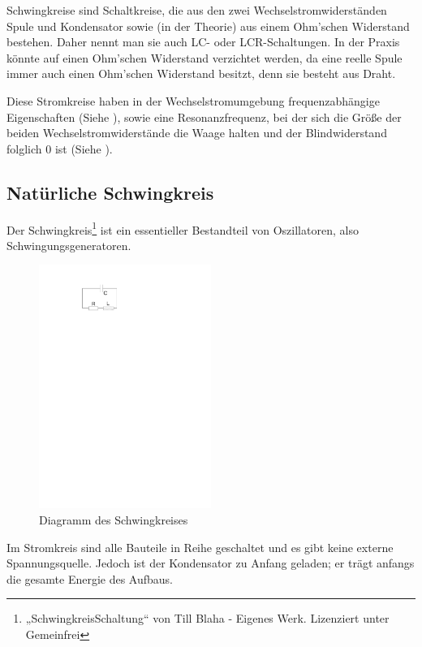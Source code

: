 
Schwingkreise sind Schaltkreise, die aus den zwei Wechselstromwiderständen Spule und Kondensator sowie (in der Theorie) aus einem Ohm'schen Widerstand bestehen. Daher nennt man sie auch LC- oder LCR-Schaltungen. In der Praxis könnte auf einen Ohm'schen Widerstand verzichtet werden, da eine reelle Spule immer auch einen Ohm'schen Widerstand besitzt, denn sie besteht aus Draht. 

Diese Stromkreise haben in der Wechselstromumgebung frequenzabhängige Eigenschaften (Siehe ), sowie eine Resonanzfrequenz, bei der sich die Größe der beiden Wechselstromwiderstände die Waage halten und der Blindwiderstand folglich $0$ ist (Siehe ).

\subsection{Natürliche Schwingkreis}

Der Schwingkreis\footnote{„SchwingkreisSchaltung“ von Till Blaha - Eigenes Werk. Lizenziert unter Gemeinfrei} ist ein essentieller Bestandteil von Oszillatoren, also Schwingungsgeneratoren. 

\begin{figure}[h!]
	\centering
	\includegraphics[width=0.5\textwidth]{Pictures/Schwingkreis}
	\caption{Diagramm des Schwingkreises}
\end{figure}

Im Stromkreis sind alle Bauteile in Reihe geschaltet und es gibt keine externe Spannungsquelle. Jedoch ist der Kondensator zu Anfang geladen; er trägt anfangs die gesamte Energie des Aufbaus.

